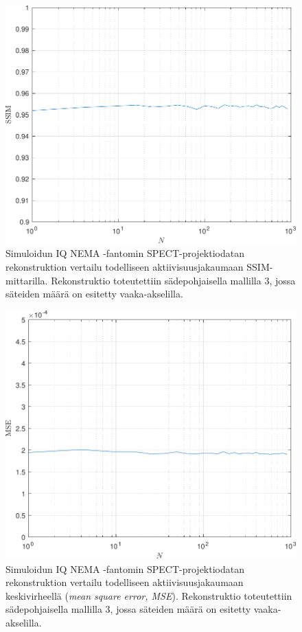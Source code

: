\begin{figure}[H]
    \centering
    \captionsetup{width=.9\linewidth}
    \includegraphics[width=.9\linewidth]{kuvat/vertailu_SSIM.pdf}
    \caption{Simuloidun IQ NEMA -fantomin SPECT-projektiodatan rekonstruktion vertailu todelliseen aktiivisuusjakaumaan SSIM-mittarilla. Rekonstruktio toteutettiin sädepohjaisella mallilla 3, jossa säteiden määrä on esitetty vaaka-akselilla.}
    \label{fig:vertailu_SSIM}
\end{figure}
\begin{figure}[H]
    \centering
    \captionsetup{width=.9\linewidth}
    \includegraphics[width=.9\linewidth]{kuvat/vertailu_MSE.pdf}
    \caption{Simuloidun IQ NEMA -fantomin SPECT-projektiodatan rekonstruktion vertailu todelliseen aktiivisuusjakaumaan keskivirheellä (\textit{mean square error, MSE}). Rekonstruktio toteutettiin sädepohjaisella mallilla 3, jossa säteiden määrä on esitetty vaaka-akselilla.}
    \label{fig:vertailu_MSE}
\end{figure}

